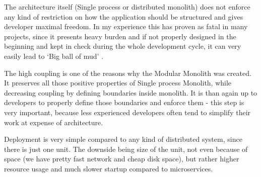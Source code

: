 The architecture itself (Single process or distributed monolith) does not enforce any kind of restriction on how the application should be structured and gives developer maximal freedom. In my experience this has proven as fatal in many projects, since it presents heavy burden and if not properly designed in the beginning and kept in check during the whole development cycle, it can very easily lead to `Big ball of mud' \cite{BIG_BALL_OF_MUD}.

The high coupling is one of the reasons why the Modular Monolith was created. It preserves all those positive properties of Single process Monolith, while decreasing coupling by defining boundaries inside monolith. It is than again up to developers to properly define those boundaries and enforce them - this step is very important, because less experienced developers often tend to simplify their work at expense of architecture.

Deployment is very simple compared to any kind of distributed system, since there is just one unit. The downside being size of the unit, not even because of space (we have pretty fast network and cheap disk space), but rather higher resource usage and much slower startup compared to microservices.

